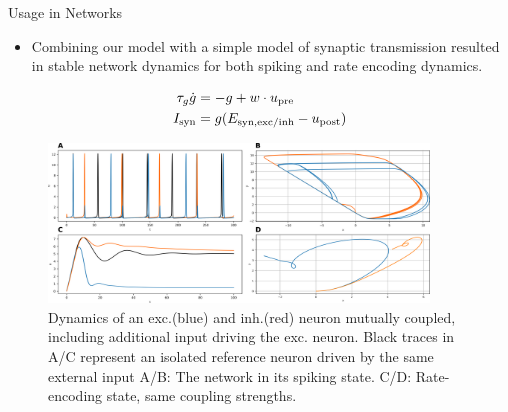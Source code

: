 \documentclass{beamer}
\begin{document}
\begin{frame}[t]
\begin{columns}[t]
\begin{column}{.45\textwidth}
\begin{myblock}{Usage in Networks}
\begin{itemize}
\item Combining our model with a simple model of synaptic transmission resulted in stable network dynamics for both spiking and rate encoding dynamics.
\end{itemize}
\begin{align*}
\tau_g \dot{g} &= -g + w \cdot u_{\rm pre} \\
I_{\rm syn} &= g(E_{\rm syn,exc/inh} - u_{\rm post})
\end{align*}
\begin{figure}
\includegraphics[width=0.9\textwidth]{../figures/graphics/network_dyn_combined.png}
\caption{Dynamics of an exc.(blue) and inh.(red) neuron mutually coupled, including additional input driving the exc. neuron. Black traces in A/C represent an isolated reference neuron driven by the same external input A/B: The network in its spiking state. C/D: Rate-encoding state, same coupling strengths.}
\end{figure}
\end{myblock}



\end{column}
\end{columns}
\end{frame}
\end{document}
